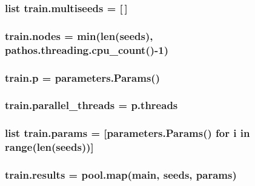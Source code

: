 \subsubsection[{\texorpdfstring{multiseeds}{multiseeds}}]{\setlength{\rightskip}{0pt plus 5cm}list train.\+multiseeds = \mbox{[}$\,$\mbox{]}}\hypertarget{namespacetrain_a55ff5a0fd8be24fcfc82156461c2f454}{}\label{namespacetrain_a55ff5a0fd8be24fcfc82156461c2f454}
\subsubsection[{\texorpdfstring{nodes}{nodes}}]{\setlength{\rightskip}{0pt plus 5cm}train.\+nodes = min(len({\bf seeds}), pathos.\+threading.\+cpu\+\_\+count()-\/1)}\hypertarget{namespacetrain_a188bbaf51d6b5fb3054962f9c79caa10}{}\label{namespacetrain_a188bbaf51d6b5fb3054962f9c79caa10}
\subsubsection[{\texorpdfstring{p}{p}}]{\setlength{\rightskip}{0pt plus 5cm}train.\+p = {\bf parameters.\+Params}()}\hypertarget{namespacetrain_a1778402e6b76cfcc78aa05d331c47e5e}{}\label{namespacetrain_a1778402e6b76cfcc78aa05d331c47e5e}
\subsubsection[{\texorpdfstring{parallel\+\_\+threads}{parallel_threads}}]{\setlength{\rightskip}{0pt plus 5cm}train.\+parallel\+\_\+threads = p.\+threads}\hypertarget{namespacetrain_a02e7c583834b3067d0ee6283eddd59a4}{}\label{namespacetrain_a02e7c583834b3067d0ee6283eddd59a4}
\subsubsection[{\texorpdfstring{params}{params}}]{\setlength{\rightskip}{0pt plus 5cm}list train.\+params = \mbox{[}{\bf parameters.\+Params}() for i in range(len({\bf seeds}))\mbox{]}}\hypertarget{namespacetrain_ab0738cb047f54be07fe3b6e00ccb6bde}{}\label{namespacetrain_ab0738cb047f54be07fe3b6e00ccb6bde}
\subsubsection[{\texorpdfstring{results}{results}}]{\setlength{\rightskip}{0pt plus 5cm}train.\+results = pool.\+map({\bf main}, {\bf seeds}, {\bf params})}\hypertarget{namespacetrain_a7b7ff8fca2a83224c8cdbe1fcb1d4f02}{}\label{namespacetrain_a7b7ff8fca2a83224c8cdbe1fcb1d4f02}
